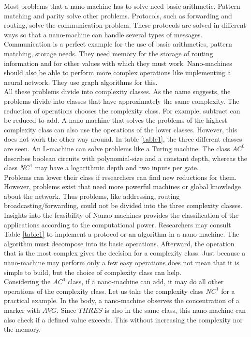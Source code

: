 \documentclass[10pt,sigconf]{acmart}
\begin{document}
Most problems that a nano-machine has to solve need basic arithmetic.
Pattern matching and parity solve other problems.
Protocols, such as forwarding and routing, solve the communication problem. 
These protocols are solved in different ways so that a nano-machine can handle several types of messages.
Communication is a perfect example for the use of basic arithmetics, pattern matching, storage needs.
They need memory for the storage of routing information and for other values with which they must work.
Nano-machines should also be able to perform more complex operations like implementing a neural network.
They use graph algorithms for this.\\
All these problems divide into complexity classes.
As the name suggests, the problems divide into classes that have approximately the same complexity.
The reduction of operations chooses the complexity class. For example, subtract can be reduced to add. 
A nano-machine that solves the problems of the highest complexity class can also use the operations of the lower classes.
However, this does not work the other way around.
In table \ref{table1}, the three different classes are seen.
An L-machine can solve problems like a Turing machine.
The class $AC^0$ describes boolean circuits with polynomial-size and a constant depth, whereas the class $NC^1$ may have a logarithmic depth and two inputs per gate.\\ 
Problems can lower their class if researchers can find new reductions for them. 
However, problems exist that need more powerful machines or global knowledge about the network.
Thus problems, like addressing, routing broadcasting/forwarding, could not be divided into the three complexity classes.\\
Insights into the feasibility of Nanao-machines provides the classification of the applications according to the computational power. 
Researchers may consult Table \ref{table1} to implement a protocol or an algorithm in a nano-machine. 
The algorithm must decompose into its basic operations. Afterward, the operation that is the most complex gives the decision for a complexity class.
Just because a nano-machine may perform only a few easy operations does not mean that it is simple to build, but the choice of complexity class can help.\\
Considering the $AC^0$ class, if a nano-machine can add, it may do all other operations of the complexity class.
Let us take the complexity class $NC^1$ for a practical example. In the body, a nano-machine observes the concentration of a marker with $AVG$.
Since $THRES$ is also in the same class, this nano-machine can also check if a defined value exceeds. This without increasing the complexity nor the memory.
\end{document}
